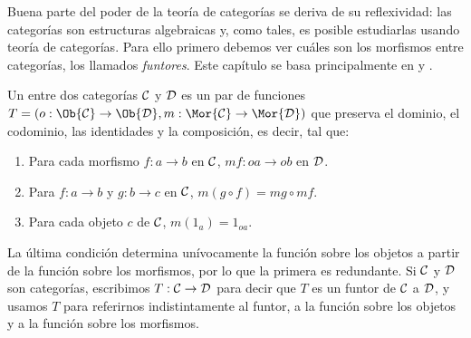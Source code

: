 Buena parte del poder de la teoría de categorías se deriva de su reflexividad:
las categorías son estructuras algebraicas y, como tales, es posible estudiarlas
usando teoría de categorías. Para ello primero debemos ver cuáles son los
morfismos entre categorías, los llamados \emph{funtores}. Este capítulo se basa
principalmente en \cite[pp. 21--32 y cap. 7]{joyofcats} y
\cite[pp. 13--15]{maclane}.

\begin{definition}
  Un  entre dos categorías $\mathcal{C}$ y $\mathcal{D}$ es un par de funciones
  $T=(o:\Ob{\cC}\to\Ob{\cD},m:\Mor{\cC}\to\Mor{\cD})$ que preserva el dominio, el
  codominio, las identidades y la composición, es decir, tal que:
  \begin{enumerate}
  \item Para cada morfismo $f:a\to b$ en $\mathcal{C}$, $mf:oa\to ob$ en $\mathcal{D}$.
  \item Para $f:a\to b$ y $g:b\to c$ en $\mathcal{C}$, $m(g\circ f)=mg\circ mf$.
  \item Para cada objeto $c$ de $\mathcal{C}$, $m(1_a)=1_{oa}$.
  \end{enumerate}
\end{definition}

La última condición determina unívocamente la función sobre los objetos a partir
de la función sobre los morfismos, por lo que la primera es redundante. Si $\mathcal{C}$
y $\mathcal{D}$ son categorías, escribimos $T:\mathcal{C}\to\mathcal{D}$ para decir que $T$ es un funtor
de $\mathcal{C}$ a $\mathcal{D}$, y usamos $T$ para referirnos indistintamente al funtor, a la
función sobre los objetos y a la función sobre los morfismos.

